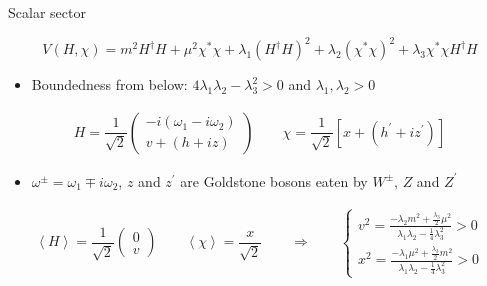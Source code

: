 \documentclass[10pt,xcolor=dvipsnames,mathserif]{beamer}
\renewcommand{\(}{\left(}
\renewcommand{\)}{\right)}
\renewcommand{\[}{\left[}
\renewcommand{\]}{\right]}
\newcommand{\mean}[1]{\left \langle #1 \right \rangle }
\begin{document}
\begin{frame}{Scalar sector}
	
		\begin{equation*}
		\label{eq:potential}
		V(H,\chi)= m^2 H^\dagger H + \mu^2 \chi^\ast \chi + \lambda_1 (H^\dagger H)^2 + \lambda_2 \(\chi^\ast \chi\)^2 + \lambda_3  \chi^\ast \chi H^\dagger H
		\end{equation*}
		
				
		\begin{itemize}
			 \item Boundedness from below: $4 \lambda_1 \lambda_2 - \lambda_3^2 >0$ and $\lambda_1,\lambda_2 > 0$
		\end{itemize}
		
	\begin{equation*}
	\begin{aligned}
	H = \dfrac{1}{\sqrt{2}} 
		\begin{pmatrix}
		-i \(\omega_1 - i \omega_2 \) \\
		v + (h + i z)
		\end{pmatrix}	
		\qquad
		\chi = \dfrac{1}{\sqrt{2}} \[ x + \(h^\prime + i z^\prime\) \]	
	\end{aligned}
	\end{equation*}	

		\begin{itemize}
			\item $\omega^\pm = \omega_1 \mp i \omega_2$, $z$ and $z^\prime$ are Goldstone bosons eaten by $W^\pm$, $Z$ and $Z^\prime$
		\end{itemize}		
		\begin{equation*}
		\begin{aligned}
		\mean{H} = \dfrac{1}{\sqrt{2}} 
		\begin{pmatrix}
		0 \\
		v 
		\end{pmatrix}	
		\qquad
		\mean{\chi} = \dfrac{x}{\sqrt{2}}
		\qquad \Rightarrow \qquad
		\begin{cases}
		v^2 = \tfrac{-\lambda_2 m^2 + \tfrac{\lambda_3}{2}\mu^2}{\lambda_1 \lambda_2 - \tfrac{1}{4}\lambda_3^2} > 0\\
		x^2 = \tfrac{-\lambda_1 \mu^2 + \tfrac{\lambda_3}{2}m^2}{\lambda_1 \lambda_2 - \tfrac{1}{4}\lambda_3^2} > 0
		\end{cases}	
		\end{aligned}
		\end{equation*}			
		
\end{frame}
\end{document}
